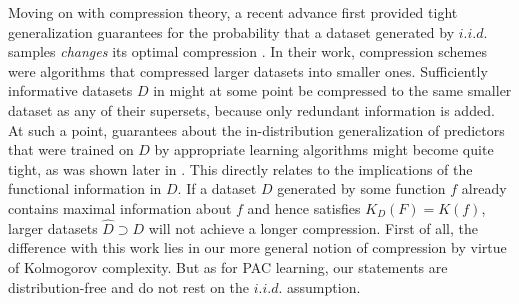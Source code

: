 
Moving on with compression theory, a recent advance first provided tight generalization guarantees for the probability that a dataset generated by $i.i.d.$ samples \textit{changes} its optimal compression \cite{campi2023compression}.
In their work, compression schemes were algorithms that compressed larger datasets into smaller ones.
Sufficiently informative datasets $D$ in \cite{campi2023compression} might at some point be compressed to the same smaller dataset as any of their supersets, because only redundant information is added.
At such a point, guarantees about the in-distribution generalization of predictors that were trained on $D$ by appropriate learning algorithms might become quite tight, as was shown later in \cite{paccagnan2024pick}.
This directly relates to the implications of the functional information in $D$. 
If a dataset $D$ generated by some function $f$ already contains maximal information about $f$ and hence satisfies $K_D(F)=K(f)$, larger datasets $\hat{D}\supset D$ will not achieve a longer compression.
First of all, the difference with this work lies in our more general notion of compression by virtue of Kolmogorov complexity. 
But as for PAC learning, our statements are distribution-free and do not rest on the $i.i.d.$ assumption.

